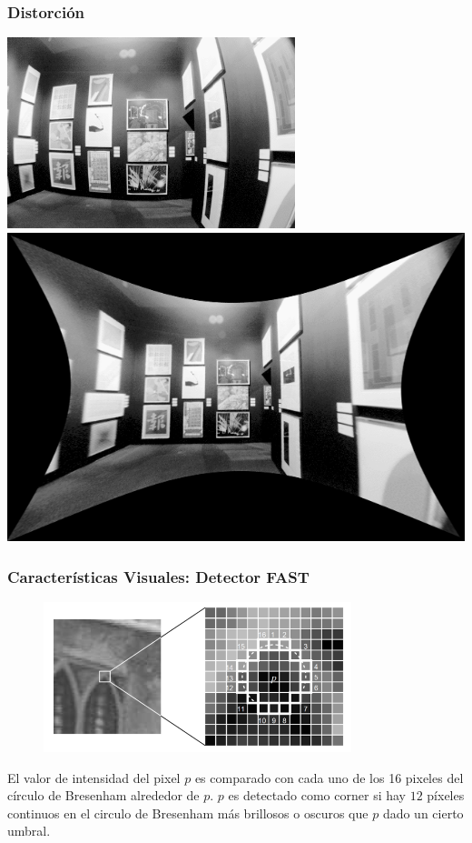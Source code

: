 \begin{frame}
	\frametitle{Distorción}
	
	\includegraphics[width=0.4\columnwidth]{images/camera/distorted_image.png}
	\includegraphics[width=0.4\columnwidth]{images/camera/undistorted_image.png}
	
\end{frame}


\begin{frame}
	\frametitle{Características Visuales: Detector FAST}
	
	\begin{figure}
		\includegraphics[width=0.8\textwidth]{./images/camera/fast}
	\end{figure}
	
	El valor de intensidad del pixel $p$ es comparado con cada uno de los 16 pixeles del círculo de Bresenham alrededor de $p$. $p$ es detectado como corner si hay $12$ píxeles continuos en el circulo de Bresenham más brillosos o oscuros que $p$ dado un cierto umbral.
\end{frame}

